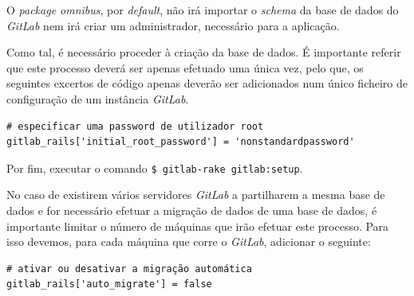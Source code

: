 \documentclass[12pt,a4paper]{article}
\begin{document}
O \emph{package omnibus}, por \emph{default}, não irá importar o \emph{schema} da base de dados do \emph{GitLab} nem irá criar um administrador, necessário para a aplicação.

Como tal, é necessário proceder à criação da base de dados. É importante referir que este processo deverá ser apenas efetuado uma única vez, pelo que, os seguintes excertos de código apenas deverão ser adicionados num único ficheiro de configuração de um instância \emph{GitLab}.

\begin{verbatim}
# especificar uma password de utilizador root
gitlab_rails['initial_root_password'] = 'nonstandardpassword'
\end{verbatim}

Por fim, executar o comando \texttt{\$ gitlab-rake gitlab:setup}.

No caso de existirem vários servidores \emph{GitLab} a partilharem a mesma base de dados e for necessário efetuar a migração de dados de uma base de dados, é importante limitar o número de máquinas que irão efetuar este processo. Para isso devemos, para cada máquina que corre o \emph{GitLab}, adicionar o seguinte:

\begin{verbatim}
# ativar ou desativar a migração automática
gitlab_rails['auto_migrate'] = false
\end{verbatim}





\end{document}
